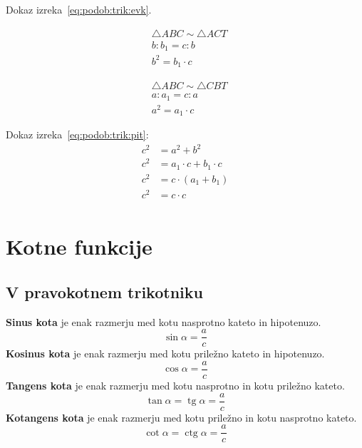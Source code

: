 \documentclass[a4paper,oneside,12pt,fleqn]{article}
\newcommand\krat\cdot
\newcommand{\tg}{\ensuremath{\operatorname{tg}}} %
\newcommand{\ctg}{\ensuremath{\operatorname{ctg}}} %
\numberwithin{equation}{section}
\begin{document}
Dokaz izreka~\eqref{eq:podob:trik:evk}.\\[-16pt]
\parbox[t]{0.5\textwidth}{
\begin{align*}
  &\triangle ABC \sim \triangle ACT \\
  & b : b_1 = c : b \\
  & b^2 = b_1\krat c
\end{align*}
}
\parbox[t]{0.5\textwidth}{
\begin{align*}
  &\triangle ABC \sim \triangle CBT \\
  & a : a_1 = c : a \\
  & a^2 = a_1\krat c
\end{align*}
}

Dokaz izreka~\eqref{eq:podob:trik:pit}:
\begin{align*}
  c^2 &= a^2 + b^2 \\
  c^2 &= a_1 \krat c + b_1 \krat c \\
  c^2 &= c \krat (a_1 + b_1) \\
  c^2 &= c \krat c \\
\end{align*}



\section{Kotne funkcije}
\label{sec:kot}

\subsection{V pravokotnem trikotniku}
\label{sec:kot:prav}
\textbf{Sinus kota} je enak razmerju med kotu nasprotno kateto in hipotenuzo.
\[ \sin\alpha = \frac{a}{c} \]
\textbf{Kosinus kota} je enak razmerju med kotu priležno kateto in hipotenuzo.
\[ \cos\alpha = \frac{a}{c} \]
\textbf{Tangens kota} je enak razmerju med kotu nasprotno in kotu priležno kateto.
\[ \tan\alpha = \tg\alpha = \frac{a}{c} \]
\textbf{Kotangens kota} je enak razmerju med kotu priležno in kotu nasprotno kateto.
\[ \cot\alpha = \ctg\alpha = \frac{a}{c} \]
\end{document}
